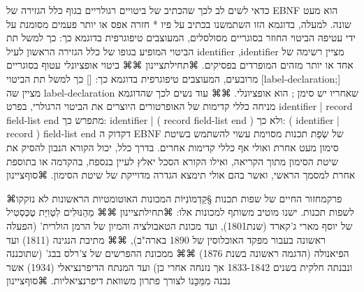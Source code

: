       כדאי לשים לב לכך שהכתיב של ביטויים רגולריים בגוף כלל הגזירה של EBNF הוא מעט
      שונה. למעלה, בדוגמא הזו השתמשנו בכתיב על פיו * חזרה אפס או יותר פעמים מסומנת על
      ידי עטיפה הביטוי החוזר בסוגריים מסולסלים, המעוצבים טיפוגרפית בדוגמא כך: {} כך
      למשל תת הביטוי המופיע בגופו של כלל הגזירה הראשון לעיל
      identifier {,identifier}
      מציין רשימה של אחד או יותר מזהים המופרדים בפסיקים.
      ⌘תחילת{ציינון}
      ⌘⌘ ביטוי אופציונלי עטוף בסוגריים מרובעים, המעוצבים טיפוגרפית בדוגמא כך: [] כך למשל תת הביטוי
      [label-declaration;]
      מציין שה label-declaration שאחריו יש סימן ; הוא אופציונלי.
      ⌘⌘ עוד נשים לכך שהדוגמא מניחה כללי קדימות של האופרטורים היוצרים את הביטוי הרגולרי, בפרט
      identifier | record field-list end
      מתפרש כך:
      identifier | ( record field-list end )
      ולא כך:
      ( identifier | record ) field-list end
      דקדוק ה EBNF של שְׂפַת תכנות מסוימת עשוי להשתמש בשיטת סימון מעט אחרת ואולי אף כללי קדימות אחרים. בדרך כלל, יכול הקורא הנבון להסיק את שיטת הסימון מתוך הקריאה, ואילו הקורא הסכל יאלץ לעיין בנספח, בהקדמה או בתוספת אחרת למסמך הראשי, ואשר בהם אולי תימצא הגדרה מדוייקת של שיטת הסימון.
  ⌘סוף{ציינון}

 
     
     ⌘פרק{מחזור החיים של שפות תכנות}
     §קַדְמוֹנִיּוֹת
     המכונות האוטומטיות הראשונות לא נזקקו לשפות תכנות. ישנו מוטיב משותף למכונות אלו:
     ⌘תחילת{ציינון}
         ⌘⌘ מֵהַנּוּלִים לִטְוִיַּת טֶכְּסְטִיל של יוסף מארי ג'קארד (שנת1801), ועד מכונת הטאבולציה והמיון של הרמן הולרית' (הפעלה ראשונה בעבור מפקד האוכלוסין של 1890 בארה"ב),
         ⌘⌘ מתיבת הנגינה (1811) ועד הפיאנולה (הדגמה ראשונה בשנת 1876)
         ⌘⌘ ממכונת ההפרשים של צ'רלס בבג' (שתוכננה ונבנתה חלקית בשנים 1833-1842 אך נזנחה אחרי כן) ועד המנתח הדיפרנציאלי (1934) אשר נבנה מִמֵּכָּנוֹ לצורך פתרון משוואת דיפרנציאליות.
        ⌘סוף{ציינון} 
        
